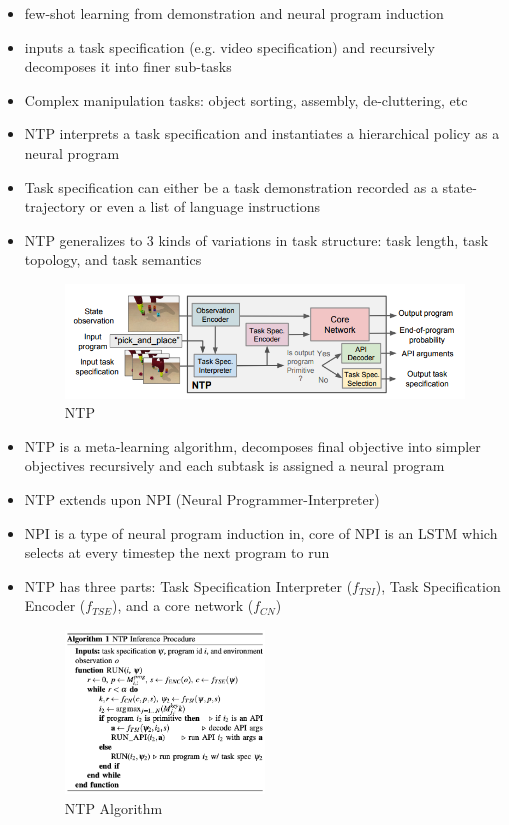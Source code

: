 \begin{itemize}
  \item few-shot learning from demonstration and neural program induction
  \item inputs a task specification (e.g. video specification) and recursively decomposes it into finer sub-tasks
  \item Complex manipulation tasks: object sorting, assembly, de-cluttering, etc
  \item NTP interprets a task specification and instantiates a hierarchical policy as a neural program
  \item Task specification can either be a task demonstration recorded as a state-trajectory or even a list of language instructions
  \item NTP generalizes to 3 kinds of variations in task structure: task length, task topology, and task semantics
  \begin{figure}[H]
    \caption{NTP}
    \centering
    \includegraphics[width=\textwidth]{../../imgs/ntp.png}
  \end{figure}
  \item NTP is a meta-learning algorithm, decomposes final objective into simpler objectives recursively and each subtask is assigned a neural program
  \item NTP extends upon NPI (Neural Programmer-Interpreter)
  \item NPI is a type of neural program induction in, core of NPI is an LSTM which selects at every timestep the next program to run
  \item NTP has three parts: Task Specification Interpreter ($f_{TSI}$), Task Specification Encoder ($f_{TSE}$), and a core network ($f_{CN}$)
  \begin{figure}[H]
    \caption{NTP Algorithm}
    \centering
    \includegraphics[width=0.5\textwidth]{../../imgs/ntp_algorithm.png}

\end{figure}
\end{itemize}
